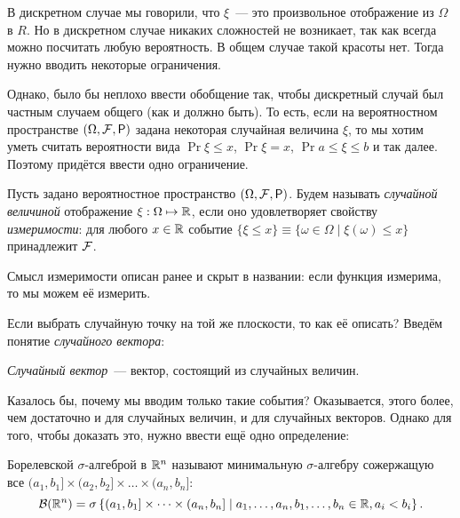 В дискретном случае мы говорили, что \(\xi\)~--- это произвольное отображение из \(\Omega\) в \(R\). Но в дискретном случае никаких сложностей не возникает, так как всегда можно посчитать любую вероятность. В общем случае такой красоты нет. Тогда нужно вводить некоторые ограничения.

Однако, было бы неплохо ввести обобщение так, чтобы дискретный случай был частным случаем общего (как и должно быть). То есть, если на вероятностном пространстве \((\Omega, \F, \Pr)\) задана некоторая случайная величина \(\xi\), то мы хотим уметь считать вероятности вида \(\Pr{\xi \leq x}\), \(\Pr{\xi = x}\), \(\Pr{a \leq \xi \leq b}\) и так далее. Поэтому придётся ввести одно ограничение. 

\begin{definition}
	Пусть задано вероятностное пространство \((\Omega, \F, \Pr)\). Будем называть \emph{случайной величиной} отображение \(\xi : \Omega \mapsto \mathbb{R}\), если оно удовлетворяет свойству \emph{измеримости}: для любого \(x \in \mathbb{R}\) событие \(\{\xi \leq x\} \equiv \{\omega \in \Omega \mid \xi(\omega) \leq x\}\) принадлежит \(\mathcal{F}\).
\end{definition}

Смысл измеримости описан ранее и скрыт в названии: если функция измерима, то мы можем её измерить.

Если выбрать случайную точку на той же плоскости, то как её описать? Введём понятие \emph{случайного вектора}:

\begin{definition}
    \emph{Случайный вектор}~--- вектор, состоящий из случайных величин.
\end{definition}

Казалось бы, почему мы вводим только такие события? Оказывается, этого более, чем достаточно и для случайных величин, и для случайных векторов. Однако для того, чтобы доказать это, нужно ввести ещё одно определение:

\begin{definition}
    Борелевской $\sigma$-алгеброй в $\mathbb{R}^n$ называют минимальную $\sigma$-алгебру сожержащую все \((a_1,  b_1] \times (a_2, b_2] \times \dots \times (a_n, b_n]\):
    \[
    \mathcal{B}(\mathbb{R}^n) = \sigma\left\{(a_1, b_1] \times \dots \times (a_n, b_n] \mid a_1, \dots, a_n, b_1, \dots, b_n \in \mathbb{R}, a_i < b_i\right\}.
    \]
\end{definition}

